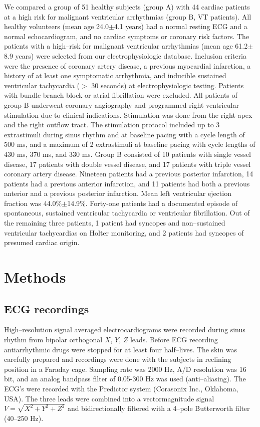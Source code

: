 \documentclass[twocolumn]{cinc}
\begin{document}
We compared a group of 51 healthy subjects (group A) with 44 cardiac patients 
at a high risk for malignant ventricular arrhythmias (group B, VT patients). 
All healthy 
volunteers (mean age 24.0$\pm$4.1 years) had a normal resting ECG and a normal 
echocardiogram, and no cardiac symptoms or coronary risk factors. 
The patients with a
high--risk for malignant ventricular arrhythmias (mean age 61.2$\pm$8.9 years) were selected 
from our electrophysiologic database. Inclusion criteria were the presence of coronary 
artery disease, a previous myocardial infarction, a history of at least one symptomatic 
arrhythmia, and inducible sustained ventricular tachycardia ($>$ 30 seconds) at electrophysiologic 
testing. Patients with bundle branch block or atrial fibrillation were excluded.
All patients of group B underwent coronary angiography and programmed right ventricular 
stimulation due to clinical indications. Stimulation was done from the right apex and the 
right outflow tract. The stimulation protocol included up to 3 extrastimuli during sinus 
rhythm and at baseline pacing with a cycle length of 500 ms, and a maximum of 2 extrastimuli 
at baseline pacing with cycle lengths of 430 ms, 370 ms, and 330 ms.
Group B consisted of 10 patients with single vessel disease, 17 patients with double vessel 
disease, and 17 patients with triple vessel coronary artery disease. 
Nineteen patients had a previous posterior 
infarction, 14 patients had a previous anterior infarction, and 11 patients had both a previous 
anterior and a previous posterior infarction. Mean left ventricular ejection fraction 
was 44.0\%$\pm$14.9\%. Forty-one patients had a documented episode of spontaneous, sustained 
ventricular tachycardia or ventricular fibrillation. Out of the remaining 
three patients, 1 patient had syncopes 
and non--sustained ventricular tachycardias on Holter monitoring, and 2 patients had syncopes 
of presumed cardiac origin.
 


\section{Methods}


\subsection{ECG recordings}
High--resolution signal averaged electrocardiograms  
were recorded during sinus rhythm from bipolar orthogonal $X$, $Y$, $Z$ leads. 
Before ECG recording antiarrhythmic drugs were stopped for at least four half--lives.
The skin was carefully prepared and recordings were done with the subjects in reclining 
position in a Faraday cage. Sampling rate was 2000 Hz, A/D resolution was 16 bit, and an 
analog bandpass filter of 0.05-300 Hz was used (anti--aliasing).  The ECG's were recorded 
with the Predictor system (Corasonix Inc., Oklahoma, USA).   
The three leads were combined into a vectormagnitude signal $V=\sqrt{X^2 + Y^2 + Z^2}$ and
bidirectionally filtered with a 4--pole Butterworth filter (40--250 Hz). 
\end{document}
